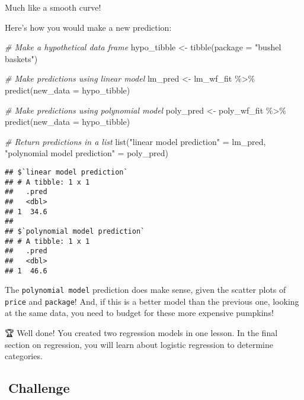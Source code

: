 \documentclass[
]{article}
\newenvironment{Shaded}{\begin{snugshade}}{\end{snugshade}}
\newcommand{\AttributeTok}[1]{\textcolor[rgb]{0.77,0.63,0.00}{#1}}
\newcommand{\CommentTok}[1]{\textcolor[rgb]{0.56,0.35,0.01}{\textit{#1}}}
\newcommand{\FunctionTok}[1]{\textcolor[rgb]{0.00,0.00,0.00}{#1}}
\newcommand{\NormalTok}[1]{#1}
\newcommand{\OtherTok}[1]{\textcolor[rgb]{0.56,0.35,0.01}{#1}}
\newcommand{\SpecialCharTok}[1]{\textcolor[rgb]{0.00,0.00,0.00}{#1}}
\newcommand{\StringTok}[1]{\textcolor[rgb]{0.31,0.60,0.02}{#1}}
\begin{document}
Much like a smooth curve!🤩

Here's how you would make a new prediction:

\begin{Shaded}
\begin{Highlighting}[]
\CommentTok{\# Make a hypothetical data frame}
\NormalTok{hypo\_tibble }\OtherTok{\textless{}{-}} \FunctionTok{tibble}\NormalTok{(}\AttributeTok{package =} \StringTok{"bushel baskets"}\NormalTok{)}

\CommentTok{\# Make predictions using linear model}
\NormalTok{lm\_pred }\OtherTok{\textless{}{-}}\NormalTok{ lm\_wf\_fit }\SpecialCharTok{\%\textgreater{}\%} \FunctionTok{predict}\NormalTok{(}\AttributeTok{new\_data =}\NormalTok{ hypo\_tibble)}

\CommentTok{\# Make predictions using polynomial model}
\NormalTok{poly\_pred }\OtherTok{\textless{}{-}}\NormalTok{ poly\_wf\_fit }\SpecialCharTok{\%\textgreater{}\%} \FunctionTok{predict}\NormalTok{(}\AttributeTok{new\_data =}\NormalTok{ hypo\_tibble)}

\CommentTok{\# Return predictions in a list}
\FunctionTok{list}\NormalTok{(}\StringTok{"linear model prediction"} \OtherTok{=}\NormalTok{ lm\_pred, }
     \StringTok{"polynomial model prediction"} \OtherTok{=}\NormalTok{ poly\_pred)}
\end{Highlighting}
\end{Shaded}

\begin{verbatim}
## $`linear model prediction`
## # A tibble: 1 x 1
##   .pred
##   <dbl>
## 1  34.6
## 
## $`polynomial model prediction`
## # A tibble: 1 x 1
##   .pred
##   <dbl>
## 1  46.6
\end{verbatim}

The \texttt{polynomial\ model} prediction does make sense, given the
scatter plots of \texttt{price} and \texttt{package}! And, if this is a
better model than the previous one, looking at the same data, you need
to budget for these more expensive pumpkins!

🏆 Well done! You created two regression models in one lesson. In the
final section on regression, you will learn about logistic regression to
determine categories.

\hypertarget{challenge}{%
\subsection{\texorpdfstring{\textbf{🚀Challenge}}{🚀Challenge}}\label{challenge}}
\end{document}
